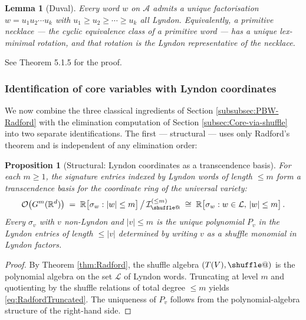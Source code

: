 \documentclass[12pt,english]{article}
\makeatletter
\providecommand*{\shuffle}{\mathbin{\mathpalette\shuffle@{}}}
\newcommand*{\shuffle@}[2]{%
  \sbox0{$#1\vcenter{}$}%
  \kern .15\ht0
  \rlap{\vrule height .25\ht0 depth 0pt width 2.5\ht0}%
  \raise.1\ht0\hbox to 2.5\ht0{%
    \vrule height 1.75\ht0 depth -.1\ht0 width .17\ht0
    \hfill
    \vrule height 1.75\ht0 depth -.1\ht0 width .17\ht0
    \hfill
    \vrule height 1.75\ht0 depth -.1\ht0 width .17\ht0}%
  \kern .15\ht0
}
\newtheorem{proposition}[theorem]{Proposition}
\newtheorem{lemma}[theorem]{Lemma}
\theoremstyle{remark}
\makeatother
\begin{document}
\begin{lemma}[Duval]
\label{lem:Duval} Every word $w$ on $\mathcal{A}$ admits a unique
factorisation $w=u_{1}u_{2}\cdots u_{k}$ with $u_{1}\geq u_{2}\geq\cdots\geq u_{k}$
all Lyndon. Equivalently, a primitive necklace --- the cyclic equivalence
class of a primitive word --- has a unique lex-minimal rotation, and
that rotation is the Lyndon representative of the necklace.
\end{lemma}

See \cite{Reutenauer} Theorem 5.1.5 for the proof.

\subsubsection{Identification of core variables with Lyndon coordinates}

We now combine the three classical ingredients of Section \ref{subsubsec:PBW-Radford}
with the elimination computation of Section \ref{subsec:Core-via-shuffle}
into two separate identifications. The first --- structural --- uses
only Radford's theorem and is independent of any elimination order:

\begin{proposition}[Structural: Lyndon coordinates as a transcendence basis]
\label{prop:lyndon-transcendence}
For each $m\geq1$, the signature entries indexed by Lyndon words of
length $\leq m$ form a transcendence basis for the coordinate ring
of the universal variety:
\begin{equation}
\mathcal{O}\bigl(G^{m}(\mathbb{R}^{d})\bigr)\;=\;\mathbb{R}\bigl[\sigma_{w}:|w|\leq m\bigr]\,\big/\,\mathcal{I}_{\shuffle}^{(\leq m)}\;\cong\;\mathbb{R}\bigl[\sigma_{w}:w\in\mathcal{L},\,|w|\leq m\bigr]\,.\label{eq:RadfordTruncated}
\end{equation}
Every $\sigma_{v}$ with $v$ non-Lyndon and $|v|\leq m$ is the unique
polynomial $P_{v}$ in the Lyndon entries of length $\leq|v|$ determined
by writing $v$ as a shuffle monomial in Lyndon factors.
\end{proposition}

\begin{proof}
By Theorem \ref{thm:Radford}, the shuffle algebra $(T(V),\shuffle)$
is the polynomial algebra on the set $\mathcal{L}$ of Lyndon words.
Truncating at level $m$ and quotienting by the shuffle relations of
total degree $\leq m$ yields \eqref{eq:RadfordTruncated}. The uniqueness
of $P_{v}$ follows from the polynomial-algebra structure of the right-hand
side.
\end{proof}
\end{document}

